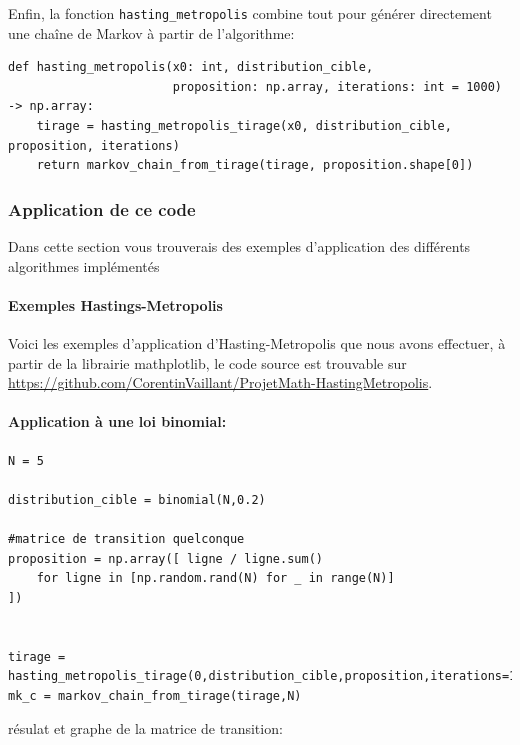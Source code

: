 \documentclass{article}
\begin{document}
Enfin, la fonction \texttt{hasting\_metropolis} combine tout pour générer directement une chaîne de Markov à partir de l'algorithme:

\begin{verbatim}
def hasting_metropolis(x0: int, distribution_cible, 
                       proposition: np.array, iterations: int = 1000) -> np.array:
    tirage = hasting_metropolis_tirage(x0, distribution_cible, proposition, iterations)
    return markov_chain_from_tirage(tirage, proposition.shape[0])
\end{verbatim}

\newpage
\subsubsection{Application de ce code}

Dans cette section vous trouverais des exemples d'application des différents algorithmes implémentés 

\paragraph{Exemples Hastings-Metropolis}

Voici les exemples d'application d'Hasting-Metropolis que nous avons effectuer, à partir de la librairie mathplotlib, le code source est trouvable sur \url{https://github.com/CorentinVaillant/ProjetMath-HastingMetropolis}.

\paragraph{Application à une loi binomial:}

\begin{verbatim}
N = 5

distribution_cible = binomial(N,0.2)

#matrice de transition quelconque
proposition = np.array([ ligne / ligne.sum()
    for ligne in [np.random.rand(N) for _ in range(N)]
])


tirage = hasting_metropolis_tirage(0,distribution_cible,proposition,iterations=10_000)
mk_c = markov_chain_from_tirage(tirage,N)
\end{verbatim}

résulat et graphe de la matrice de transition:
\end{document}
